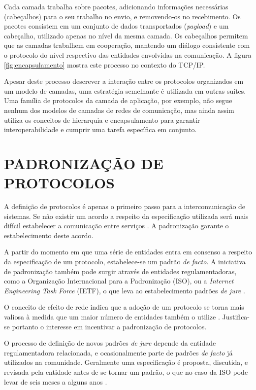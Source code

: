 Cada camada trabalha sobre pacotes, adicionando informações necessárias (cabeçalhos)
para o seu trabalho no envio, e removendo-os no recebimento. Os pacotes consistem em
um conjunto de dados transportados (\textit{payload}) e um cabeçalho, utilizado
apenas no nível da mesma camada. Os cabeçalhos permitem que as camadas trabalhem
em cooperação, mantendo um diálogo consistente com o protocolo do nível respectivo
das entidades envolvidas na comunicação. A figura \ref{fig:encapsulamento} mostra
este processo no contexto do TCP/IP.

Apesar deste processo descrever a interação entre os protocolos organizados em um
modelo de camadas, uma estratégia semelhante é utilizada em outras suítes. Uma
família de protocolos da camada de aplicação, por exemplo, não segue nenhum dos
modelos de camadas de redes de comunicação, mas ainda assim utiliza os conceitos de
hierarquia e encapsulamento para garantir interoperabilidade e cumprir uma tarefa
específica em conjunto.



\section{PADRONIZAÇÃO DE PROTOCOLOS}

A definição de protocolos é apenas o primeiro passo para a intercomunicação de
sistemas. Se não existir um acordo a respeito da especificação utilizada será mais
difícil estabelecer a comunicação entre serviços \cite{kurose2012}. A padronização
garante o estabelecimento deste acordo.

A partir do momento em que uma série de entidades entra em consenso a respeito da
especificação de um protocolo, estabelece-se um padrão \textit{de facto}. A
iniciativa de padronização também pode surgir através de entidades regulamentadoras,
como a Organização Internacional para a Padronização (ISO), ou a \textit{Internet
Engineering Task Force} (IETF), o que leva ao estabelecimento padrões \textit{de
jure} \cite{tanenbaum2010}.

O conceito de efeito de rede indica que a adoção de um protocolo se torna mais
valiosa à medida que um maior número de entidades também o utilize
\cite{liebowitz1998}. Justifica-se portanto o interesse em incentivar a padronização
de protocolos.

O processo de definição de novos padrões \textit{de jure} depende da entidade
regulamentadora relacionada, e ocasionalmente parte de padrões \textit{de facto} já
utilizados na comunidade. Geralmente uma especificação é proposta, discutida, e
revisada pela entidade antes de se tornar um padrão, o que no caso da ISO pode levar
de seis meses a alguns anos \cite{tanenbaum2010}.

